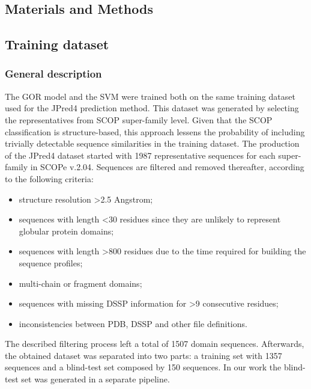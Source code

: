\documentclass[nocrop]{bioinfo}
\begin{document}
\begin{methods}
\section{Materials and Methods}
\subsection{Training dataset}
\subsubsection{General description}
The GOR model and the SVM were trained both on the same training dataset used for the JPred4 prediction method. This dataset was generated by selecting the representatives from SCOP \citep{fox2014chandonia} super-family level. Given that the SCOP classification is structure-based, this approach lessens the probability of including trivially detectable sequence similarities in the training dataset. The production of the JPred4 dataset started with 1987 representative sequences for each super-family in SCOPe v.2.04. Sequences are filtered and removed thereafter, according to the following criteria:
\begin{itemize}
\item structure resolution >2.5 Angstrom; 
\item sequences with length <30 residues since they are unlikely to represent globular protein domains;
\item sequences with length >800 residues due to the time required for building the sequence profiles;
\item multi-chain or fragment domains;
\item sequences with missing DSSP information for >9 consecutive residues;
\item inconsistencies between PDB, DSSP and other file definitions.
\end{itemize}
The described filtering process left a total of 1507 domain sequences. Afterwards, the obtained dataset was separated into two parts: a training set with 1357 sequences and a blind-test set composed by 150 sequences. In our work the blind-test set was generated in a separate pipeline. 


\end{methods}
\end{document}
